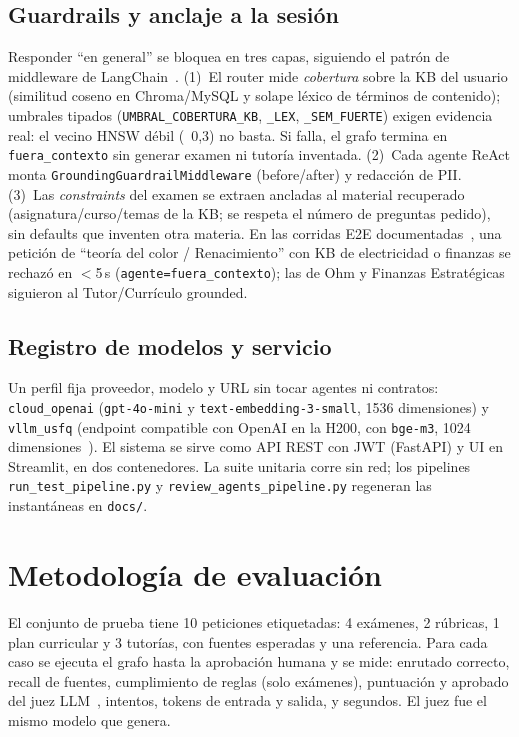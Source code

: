 \documentclass[journal]{IEEEtran}
\begin{document}
\subsection{Guardrails y anclaje a la sesión}
Responder ``en general'' se bloquea en tres capas, siguiendo el patrón de
middleware de LangChain~\cite{langchain-guardrails}. (1)~El router mide
\emph{cobertura} sobre la KB del usuario (similitud coseno en Chroma/MySQL y
solape léxico de términos de contenido); umbrales tipados
(\texttt{UMBRAL\_COBERTURA\_KB}, \texttt{\_LEX}, \texttt{\_SEM\_FUERTE}) exigen
evidencia real: el vecino HNSW débil (~0,3) no basta. Si falla, el grafo termina
en \texttt{fuera\_contexto} sin generar examen ni tutoría inventada.
(2)~Cada agente ReAct monta \texttt{GroundingGuardrailMiddleware} (before/after)
y redacción de PII. (3)~Las \emph{constraints} del examen se extraen ancladas al
material recuperado (asignatura/curso/temas de la KB; se respeta el número de
preguntas pedido), sin defaults que inventen otra materia. En las corridas E2E
documentadas~\cite{repo}, una petición de ``teoría del color / Renacimiento''
con KB de electricidad o finanzas se rechazó en $<$5\,s
(\texttt{agente=fuera\_contexto}); las de Ohm y Finanzas Estratégicas siguieron
al Tutor/Currículo grounded.

\subsection{Registro de modelos y servicio}
Un perfil fija proveedor, modelo y URL sin tocar agentes ni contratos:
\texttt{cloud\_openai} (\texttt{gpt-4o-mini} y \texttt{text-embedding-3-small}, 1536
dimensiones) y \texttt{vllm\_usfq} (endpoint compatible con OpenAI en la H200, con
\texttt{bge-m3}, 1024 dimensiones~\cite{chen2024bge}). El sistema se sirve como API REST
con JWT (FastAPI) y UI en Streamlit, en dos contenedores. La suite unitaria corre
sin red; los pipelines
\texttt{run\_test\_pipeline.py} y \texttt{review\_agents\_pipeline.py} regeneran
las instantáneas en \texttt{docs/}.

\section{Metodología de evaluación}
El conjunto de prueba tiene 10 peticiones etiquetadas: 4 exámenes, 2 rúbricas, 1 plan
curricular y 3 tutorías, con fuentes esperadas y una referencia. Para cada caso se ejecuta
el grafo hasta la aprobación humana y se mide: enrutado correcto, recall de fuentes,
cumplimiento de reglas (solo exámenes), puntuación y aprobado del juez
LLM~\cite{zheng2023judge}, intentos, tokens de entrada y salida, y segundos. El juez fue el
mismo modelo que genera.
\end{document}
